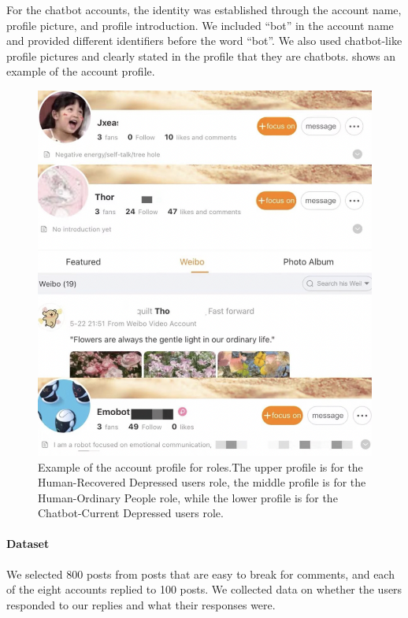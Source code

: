 For the chatbot accounts, the identity was established through the account name, profile picture, and profile introduction. We included ``bot'' in the account name and provided different identifiers before the word ``bot''. We also used chatbot-like profile pictures and clearly stated in the profile that they are chatbots.  shows an example of the account profile.
\begin{figure}[th]
    \centering
    \includegraphics[width=1\columnwidth]{images/roleplay3.png}
    \caption{Example of the account profile for roles.The upper profile is for the Human-Recovered Depressed users role, the middle profile is for the Human-Ordinary People role, while the lower profile is for the Chatbot-Current Depressed users role.}
    \label{fig:roleplay}
\end{figure}

\paragraph{Dataset}We selected 800 posts from posts that are easy to break for comments, and each of the eight accounts replied to 100 posts. We collected data on whether the users responded to our replies and what their responses were.

